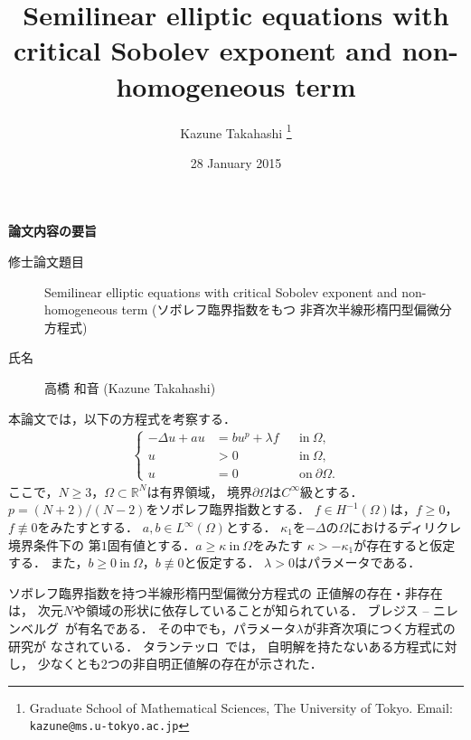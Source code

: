 \documentclass{jsarticle}
\title{Semilinear elliptic equations with critical Sobolev exponent and non-homogeneous term}
\author{Kazune Takahashi \thanks{Graduate School of Mathematical
Sciences, The University of Tokyo. Email: \texttt{kazune@ms.u-tokyo.ac.jp}}}
\date{28 January 2015}
\theoremstyle{plain}
\newcommand{\R}{\mathbb{R}}
\newcommand{\tin}{\text{in}~}
\newcommand{\ton}{\text{on}~}
\begin{document}
{\Large

\begin{center}
 \LARGE
 {\bf 論文内容の要旨}
\end{center}

\begin{description}
 \item[修士論文題目] Semilinear elliptic equations with critical
            Sobolev exponent and non-homogeneous term (ソボレフ臨界指数をもつ
            非斉次半線形楕円型偏微分方程式)
 \item[氏名] 高橋 和音 (Kazune Takahashi)
\end{description}
}

本論文では，以下の方程式を考察する．
\begin{align}
 \left\{
 \begin{aligned}
  -\Delta u + a u &= b u^p + \lambda f  & &\tin \Omega,  \\
  u &> 0 & &\tin \Omega, \\
  u &= 0 & &\ton \partial\Omega.
 \end{aligned}
 \right. \tag*{$(\spadesuit)_\lambda$} \label{eq:prob_main}
\end{align}
ここで，$N \geq 3$，$\Omega \subset \R^N$は有界領域，
境界$\partial \Omega$は$C^\infty$級とする．
$p = (N+2)/(N-2)$をソボレフ臨界指数とする．
$f \in H^{-1}(\Omega)$は，$f \geq 0$，
$f \not \equiv 0$をみたすとする．
$a, b \in L^\infty(\Omega)$とする．
$\kappa_1$を$-\Delta$の$\Omega$におけるディリクレ境界条件下の
第$1$固有値とする．$a \geq \kappa ~\tin \Omega$をみたす
$\kappa > - \kappa_1$が存在すると仮定する．
また，$b \geq 0 ~\tin \Omega$，$b \not \equiv 0$と仮定する．
$\lambda > 0$はパラメータである．

ソボレフ臨界指数を持つ半線形楕円型偏微分方程式の
正値解の存在・非存在は，
次元$N$や領域の形状に依存していることが知られている．
ブレジス -- ニレンベルグ\cite{MR709644}~が有名である．
その中でも，パラメータ$\lambda$が非斉次項につく方程式の研究が
なされている．
タランテッロ\cite{MR1168304}~では，
自明解を持たないある方程式に対し，
少なくとも$2$つの非自明正値解の存在が示された．
\end{document}
